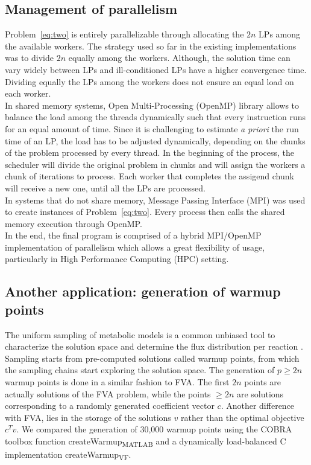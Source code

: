 \subsection{Management of parallelism}
Problem~\ref{eq:two} is entirely parallelizable through allocating the $2n$ LPs among the available workers. The strategy used so far in the existing implementations was to divide $2n$ equally among the workers. Although, the solution time can vary widely between LPs and ill-conditioned LPs have a higher convergence time. Dividing equally the LPs among the workers does not ensure an equal load on each worker. \\
In shared memory systems, Open Multi-Processing (OpenMP) library allows to balance the load among the threads dynamically such that every instruction runs for an equal amount of time. Since it is challenging to estimate \textit{a priori} the run time of an LP, the load has to be adjusted dynamically, depending on the chunks of the problem processed by every thread. In the beginning of the process, the scheduler will divide the original problem in chunks and will assign the workers a chunk of iterations to process. Each worker that completes the assigend chunk will receive a new one, until all the LPs are processed.\\
In systems that do not share memory, Message Passing Interface (MPI) was used to create instances of Problem~\ref{eq:two}. Every process then calls the shared memory execution through OpenMP.\\
In the end, the final program is comprised of a hybrid MPI/OpenMP implementation of parallelism which allows a great flexibility of usage, particularly in High Performance Computing (HPC) setting.
\subsection{Another application: generation of warmup points}
The uniform sampling of metabolic models is a common unbiased tool to characterize the solution space and determine the flux distribution per reaction \cite{bordel2010sampling,megchelenbrink2014optgpsampler}. Sampling starts from pre-computed solutions called warmup points, from which the sampling chains start exploring the solution space. The generation of $p \geq 2n$ warmup points is done in a similar fashion to FVA. The first $2n$ points are actually solutions of the FVA problem, while the points $\geq 2n$ are solutions corresponding to a randomly generated coefficient vector $c$. Another difference with FVA, lies in the storage of the solutions $v$ rather than the optimal objective $c^{T}v$. We compared the generation of 30,000 warmup points using the COBRA toolbox function createWarmup\textsubscript{MATLAB}  and a dynamically load-balanced C implementation createWarmup\textsubscript{VF}.
